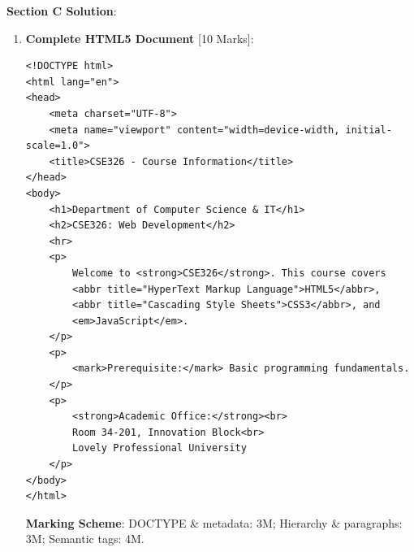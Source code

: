 \begin{solutionbox}
\noindent\textbf{Section C Solution}:
\begin{enumerate}[start=7]
    \item \textbf{Complete HTML5 Document} [10 Marks]:
\begin{lstlisting}[language=HTML5]
<!DOCTYPE html>
<html lang="en">
<head>
    <meta charset="UTF-8">
    <meta name="viewport" content="width=device-width, initial-scale=1.0">
    <title>CSE326 - Course Information</title>
</head>
<body>
    <h1>Department of Computer Science & IT</h1>
    <h2>CSE326: Web Development</h2>
    <hr>
    <p>
        Welcome to <strong>CSE326</strong>. This course covers 
        <abbr title="HyperText Markup Language">HTML5</abbr>, 
        <abbr title="Cascading Style Sheets">CSS3</abbr>, and 
        <em>JavaScript</em>.
    </p>
    <p>
        <mark>Prerequisite:</mark> Basic programming fundamentals.
    </p>
    <p>
        <strong>Academic Office:</strong><br>
        Room 34-201, Innovation Block<br>
        Lovely Professional University
    </p>
</body>
</html>
\end{lstlisting}
\textbf{Marking Scheme}: DOCTYPE \& metadata: 3M; Hierarchy \& paragraphs: 3M; Semantic tags: 4M.
\end{enumerate}
\end{solutionbox}
